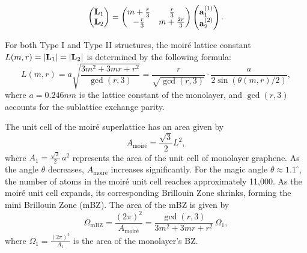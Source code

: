 \begin{itemize}
\begin{equation} \label{eq:type-II-L1L2}
\begin{pmatrix}
\vb{L}_1 \\ \vb{L}_2
\end{pmatrix} =
\begin{pmatrix}
m+\frac{r}{3} & \frac{r}{3} \\
-\frac{r}{3} & m+\frac{2r}{3}
\end{pmatrix}
\begin{pmatrix}
{\vb{a}}_1^{(1)} \\ {\vb{a}}_2^{(2)}
\end{pmatrix}.
\end{equation}

\end{itemize}

For both Type I and Type II structures, the moiré lattice constant \( L(m, r) = \abs{\vb{L}_1} = \abs{\vb{L}_2} \) is determined by the following formula:
\begin{equation} \label{eq:commensurate-constant}
L(m, r) = a \sqrt{\frac{3m^2 + 3mr + r^2}{\gcd(r, 3)}} = \frac{r}{\sqrt{\gcd(r,3)}} \cdot \frac{a}{2 \sin(\theta(m,r)/2)},
\end{equation}
where \(a = 0.246 \unit{nm}\) is the lattice constant of the monolayer, and \(\gcd(r, 3)\) accounts for the sublattice exchange parity.

The unit cell of the moiré superlattice has an area given by
\begin{equation} \label{eq:superlattice_area_unitcell}
A_{\text{moiré}} = \frac{\sqrt{3}}{2} L^2,
\end{equation}
where \( A_1 = \frac{\sqrt{3}}{2} \, a^2 \) represents the area of the unit cell of monolayer graphene. As the angle \( \theta \) decreases, \( A_{\text{moiré}} \) increases significantly. For the magic angle \( \theta \approx 1.1^\circ \), the number of atoms in the moiré unit cell reaches approximately 11,000. As the moiré unit cell expands, its corresponding Brillouin Zone shrinks, forming the mini Brillouin Zone (mBZ). The area of the mBZ is given by
\begin{equation} \label{eq:bz-volume}
\Omega_{\text{mBZ}} = \frac{(2\pi)^2}{A_{\text{moiré}}} = \frac{\gcd(r,3)}{3m^2 + 3mr + r^2} \, \Omega_1,
\end{equation}
where \( \Omega_1 = \frac{(2\pi)^2}{A_1} \) is the area of the monolayer's BZ.

